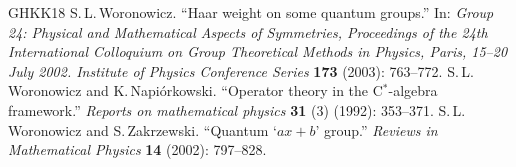 \documentclass[11pt, reqno]{amsart}
\theoremstyle{definition}
\numberwithin{equation}{section}
\begin{document}
\begin{thebibliography}{GHKK18}
 S.\,L.\,Woronowicz. ``Haar weight on some quantum groups.'' In: \emph{Group 24: Physical and Mathematical Aspects of Symmetries, Proceedings of the 24th
International Colloquium on Group Theoretical Methods in Physics, Paris, 15–20 July 2002. Institute of Physics Conference Series} \textbf{173} (2003): 763--772.
 S.\,L.\,Woronowicz and K.\,Napi\'{o}rkowski. ``Operator theory in the C$^*$-algebra framework.'' \emph{Reports on mathematical physics} \textbf{31} (3) (1992):  353--371.
 S.\,L.\,Woronowicz and S.\,Zakrzewski. ``Quantum `$ax+b$' group.'' 
\emph{Reviews in Mathematical Physics} \textbf{14} (2002): 797--828.
\end{thebibliography}
\end{document}
